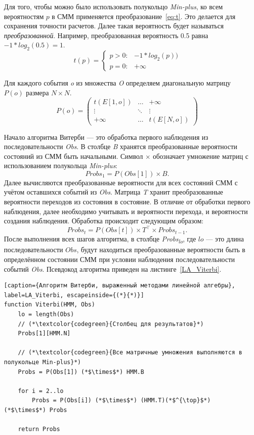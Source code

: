 Для того, чтобы можно было использовать полукольцо \emph{Min-plus}, 
ко всем вероятностям $p$ в СММ применяется 
преобразование~\ref{eq:t}.
Это делается для сохранения точности расчетов.
Далее такая вероятность будет называться \emph{преобразованной}.
Например, преобразованная вероятность 0.5
равна $-1 * log_2(0.5) = 1$.
\begin{equation}
t(p) =
	\begin{cases}
	p > 0: & -1 * log_{2}(p))\\
	p = 0: & +\infty
	\end{cases}       
  \label{eq:t}
\end{equation}

Для каждого события \emph{o} из множества \emph{O} 
определяем диагональную матрицу $P(o)$ размера $N \times N$.
\[
  P(o) =
  \begin{pmatrix}
    t(E[1,o]) & \hdots & +\infty \\
    \vdots & \ddots & \vdots\\
    +\infty & \hdots & t(E[N,o])
  \end{pmatrix}
\]

Начало алгоритма Витерби --- это обработка первого наблюдения 
из последовательности \emph{Obs}.
В столбце \emph{B} хранятся преобразованные вероятности 
состояний из СММ быть начальными.
Символ $\times$ обозначает умножение матриц с использованием 
полукольца \emph{Min-plus}:
\[Probs_{1} = P(Obs[1]) \times B.\]
Далее вычисляются преобразованные вероятности для всех 
состояний СММ с учётом ос\-тавшихся событий из \emph{Obs}.
Матрица \emph{T} хранит преобразованные вероятности 
переходов из состояния в состояние.
В отличие от обработки первого наблюдения, далее необходимо 
учитывать и вероятности перехода, и вероятности создания 
наблюдения.
Обработка происходит следующим образом:
\[Probs_{t} = P(Obs[t]) \times T^{\top} \times Probs_{t - 1}.\]
После выполнения всех шагов алгоритма, в столбце 
\emph{Probs\textsubscript{lo}}, где $lo$ --- это длина 
последовательности $Obs$, будут находиться преобразованные 
вероятности быть в определённом состоянии СММ при условии 
наблюдения последовательности событий \emph{Obs}.
Псевдокод алгоритма приведен на листинге~\ref{LA_Viterbi}.
\begin{lstlisting}[caption={Алгоритм Витерби, выраженный методами линейной алгебры}, label=LA_Viterbi, escapeinside={(*}{*)}]
function Viterbi(HMM, Obs)
	lo = length(Obs)
	// (*\textcolor{codegreen}{Столбец для результатов}*)
	Probs[1][HMM.N]

	// (*\textcolor{codegreen}{Все матричные умножения выполняются в полукольце Min-plus}*)
	Probs = P(Obs[1]) (*$\times$*) HMM.B
	
	for i = 2..lo
		Probs = P(Obs[i]) (*$\times$*) (HMM.T)(*$^{\top}$*) (*$\times$*) Probs
		
	return Probs
\end{lstlisting}


